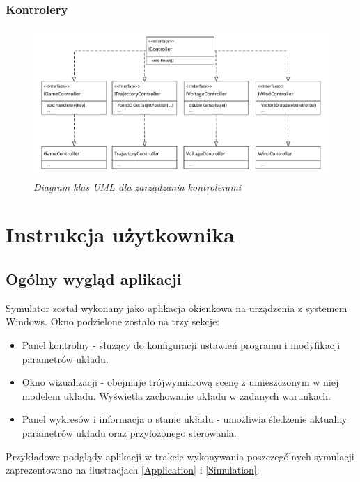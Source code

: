 \documentclass[12pt, oneside]{report}
\theoremstyle{definition}
\begin{document}
\subsection{Kontrolery}

\begin{figure}[H]
	\centering
		\includegraphics[width = 400pt]{IController} 
		\caption{\textit{Diagram klas UML dla zarządzania kontrolerami}}
		\label{IController}
\end{figure}

\chapter{Instrukcja użytkownika}
\section{Ogólny wygląd aplikacji}
Symulator został wykonany jako aplikacja okienkowa na urządzenia z systemem Windows. Okno podzielone zostało na trzy sekcje:
\begin{itemize}
\item Panel kontrolny - służący do konfiguracji ustawień programu i modyfikacji parametrów układu.
\item Okno wizualizacji - obejmuje trójwymiarową scenę z umieszczonym w niej modelem układu. Wyświetla zachowanie układu w zadanych warunkach.
\item Panel wykresów i informacja o stanie układu - umożliwia śledzenie aktualny parametrów układu oraz przyłożonego sterowania.
\end{itemize}

Przykładowe podglądy aplikacji w trakcie wykonywania poszczególnych symulacji zaprezentowano na ilustracjach \ref{Application} i \ref{Simulation}.
\end{document}
